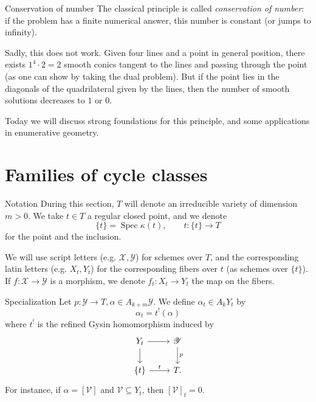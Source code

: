 \documentclass{beamer}
\newcommand{\V}{\mathscr{V}}
\newcommand{\X}{\mathscr{X}}
\newcommand{\Y}{\mathscr{Y}}
\DeclareMathOperator{\Spec}{Spec}
\begin{document}
\begin{frame}{Conservation of number}
The classical principle is called \emph{conservation of number}: if the problem has a finite numerical answer, this number is constant (or jumps to infinity).

\pause

Sadly, this does not work. Given four lines and a point in general position, there exists $1^4 \cdot 2=2$ smooth conics tangent to the lines and passing through the point (as one can show by taking the dual problem). But if the point lies in the diagonals of the quadrilateral given by the lines, then the number of smooth solutions decreases to $1$ or $0$. 

\pause 

Today we will discuss strong foundations for this principle, and some applications in enumerative geometry. 
\end{frame}




\section{Families of cycle classes}



\begin{frame}{Notation}
During this section, $T$ will denote an irreducible variety of dimension $m>0$. We take $t \in T$ a regular closed point, and we denote
\[ \{t\}=\Spec \kappa(t), \qquad t\colon \{t\} \to T \] 
for the point and the inclusion.

We will use script letters (e.g. $\X, \Y$) for schemes over $T$, and the corresponding latin letters (e.g. $X_t, Y_t$) for the corresponding fibers over $t$ (as schemes over $\{t\}$). If $f\colon \X \to \Y$ is a morphism, we denote $f_t\colon X_t \to Y_t$ the map on the fibers.
\end{frame}



\begin{frame}[fragile]{Specialization}
Let $p\colon \Y \to T, \alpha \in A_{k+m}\Y$. We define $\alpha_t \in A_k Y_t$ by
\[ \alpha_t = t^!(\alpha) \]
where $t^!$ is the refined Gysin homomorphism induced by
\[ \begin{tikzcd} Y_t \arrow[r] \arrow[d] & \Y \arrow[d, "p"] \\ {\{t\}} \arrow[r, "t"] & T. \end{tikzcd} \]\pause
For instance, if $\alpha=[\V]$ and $\V \subseteq Y_t$, then $[\V]_t=0$. 
\end{frame}
\end{document}
